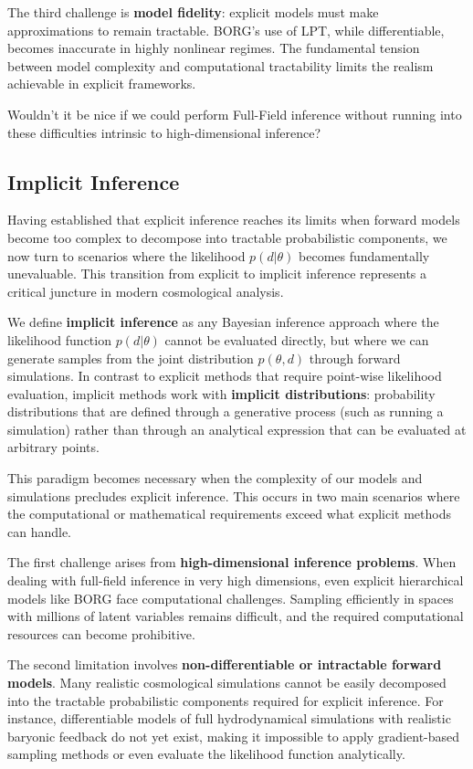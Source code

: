 \documentclass[11pt,a4paper]{article}
\theoremstyle{definition}
\begin{document}
The third challenge is \textbf{model fidelity}: explicit models must make approximations to remain tractable. BORG's use of LPT, while differentiable, becomes inaccurate in highly nonlinear regimes. The fundamental tension between model complexity and computational tractability limits the realism achievable in explicit frameworks.

\bigskip

Wouldn't it be nice if we could perform Full-Field inference without running into these difficulties intrinsic to high-dimensional inference?

\subsection{Implicit Inference}

Having established that explicit inference reaches its limits when forward models become too complex to decompose into tractable probabilistic components, we now turn to scenarios where the likelihood $p(d|\theta)$ becomes fundamentally unevaluable. This transition from explicit to implicit inference represents a critical juncture in modern cosmological analysis.

We define \textbf{implicit inference} as any Bayesian inference approach where the likelihood function $p(d|\theta)$ cannot be evaluated directly, but where we can generate samples from the joint distribution $p(\theta, d)$ through forward simulations. In contrast to explicit methods that require point-wise likelihood evaluation, implicit methods work with \textbf{implicit distributions}: probability distributions that are defined through a generative process (such as running a simulation) rather than through an analytical expression that can be evaluated at arbitrary points.

This paradigm becomes necessary when the complexity of our models and simulations precludes explicit inference. This occurs in two main scenarios where the computational or mathematical requirements exceed what explicit methods can handle.

The first challenge arises from \textbf{high-dimensional inference problems}. When dealing with full-field inference in very high dimensions, even explicit hierarchical models like BORG face computational challenges. Sampling efficiently in spaces with millions of latent variables remains difficult, and the required computational resources can become prohibitive.

The second limitation involves \textbf{non-differentiable or intractable forward models}. Many realistic cosmological simulations cannot be easily decomposed into the tractable probabilistic components required for explicit inference. For instance, differentiable models of full hydrodynamical simulations with realistic baryonic feedback do not yet exist, making it impossible to apply gradient-based sampling methods or even evaluate the likelihood function analytically.
\end{document}
